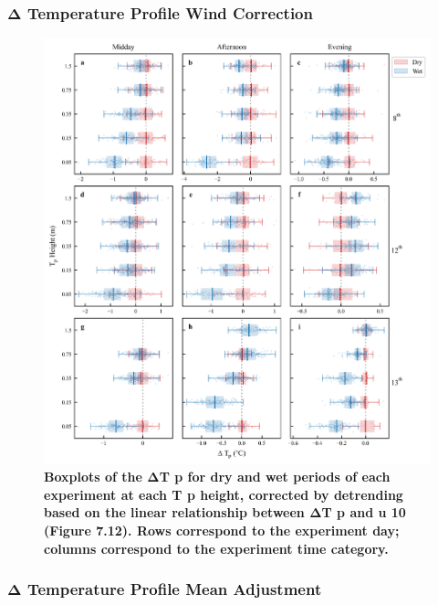 \documentclass[final,3p,times,authoryear]{elsarticle}
\begin{document}
{\subsubsection{Δ Temperature Profile Wind Correction}\label{sec:appendix7.5.5}

\begin{figure}
\centering
\includegraphics[trim={0 0 0 0},clip,scale=1.0]{pict042.png}
\caption{\bf Boxplots of the ΔT p for dry and wet periods of each experiment at each T p height, corrected
by detrending based on the linear relationship between ΔT p and u 10 (Figure 7.12). Rows correspond to
the experiment day; columns correspond to the experiment time category.}
 \label{fig:7.13}
\end{figure}

\subsubsection{Δ Temperature Profile Mean Adjustment}\label{sec:appendix7.5.6}

}
\end{document}

